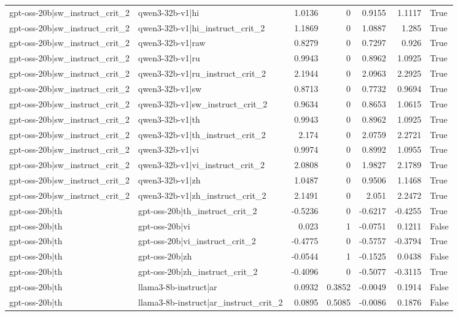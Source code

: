 \begin{table}
\begin{tabular}{l l r r r r l}
gpt-oss-20b|sw_instruct_crit_2 & qwen3-32b-v1|hi & 1.0136 & 0 & 0.9155 & 1.1117 & True \\
gpt-oss-20b|sw_instruct_crit_2 & qwen3-32b-v1|hi_instruct_crit_2 & 1.1869 & 0 & 1.0887 & 1.285 & True \\
gpt-oss-20b|sw_instruct_crit_2 & qwen3-32b-v1|raw & 0.8279 & 0 & 0.7297 & 0.926 & True \\
gpt-oss-20b|sw_instruct_crit_2 & qwen3-32b-v1|ru & 0.9943 & 0 & 0.8962 & 1.0925 & True \\
gpt-oss-20b|sw_instruct_crit_2 & qwen3-32b-v1|ru_instruct_crit_2 & 2.1944 & 0 & 2.0963 & 2.2925 & True \\
gpt-oss-20b|sw_instruct_crit_2 & qwen3-32b-v1|sw & 0.8713 & 0 & 0.7732 & 0.9694 & True \\
gpt-oss-20b|sw_instruct_crit_2 & qwen3-32b-v1|sw_instruct_crit_2 & 0.9634 & 0 & 0.8653 & 1.0615 & True \\
gpt-oss-20b|sw_instruct_crit_2 & qwen3-32b-v1|th & 0.9943 & 0 & 0.8962 & 1.0925 & True \\
gpt-oss-20b|sw_instruct_crit_2 & qwen3-32b-v1|th_instruct_crit_2 & 2.174 & 0 & 2.0759 & 2.2721 & True \\
gpt-oss-20b|sw_instruct_crit_2 & qwen3-32b-v1|vi & 0.9974 & 0 & 0.8992 & 1.0955 & True \\
gpt-oss-20b|sw_instruct_crit_2 & qwen3-32b-v1|vi_instruct_crit_2 & 2.0808 & 0 & 1.9827 & 2.1789 & True \\
gpt-oss-20b|sw_instruct_crit_2 & qwen3-32b-v1|zh & 1.0487 & 0 & 0.9506 & 1.1468 & True \\
gpt-oss-20b|sw_instruct_crit_2 & qwen3-32b-v1|zh_instruct_crit_2 & 2.1491 & 0 & 2.051 & 2.2472 & True \\
gpt-oss-20b|th & gpt-oss-20b|th_instruct_crit_2 & -0.5236 & 0 & -0.6217 & -0.4255 & True \\
gpt-oss-20b|th & gpt-oss-20b|vi & 0.023 & 1 & -0.0751 & 0.1211 & False \\
gpt-oss-20b|th & gpt-oss-20b|vi_instruct_crit_2 & -0.4775 & 0 & -0.5757 & -0.3794 & True \\
gpt-oss-20b|th & gpt-oss-20b|zh & -0.0544 & 1 & -0.1525 & 0.0438 & False \\
gpt-oss-20b|th & gpt-oss-20b|zh_instruct_crit_2 & -0.4096 & 0 & -0.5077 & -0.3115 & True \\
gpt-oss-20b|th & llama3-8b-instruct|ar & 0.0932 & 0.3852 & -0.0049 & 0.1914 & False \\
gpt-oss-20b|th & llama3-8b-instruct|ar_instruct_crit_2 & 0.0895 & 0.5085 & -0.0086 & 0.1876 & False \\

\end{tabular}
\end{table}
